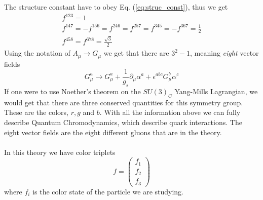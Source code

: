 \documentclass[12pt, a4paper]{book}
\begin{document}
The structure constant have to obey Eq. (\ref{eq:struc_const}), thus we get 
\begin{align*}
    f^{123}=1\\
    f^{147}=-f^{156}=f^{246}=f^{257}=f^{345}=-f^{367}={\frac{1}{2}}\\
    f^{458}=f^{678}={\frac {\sqrt {3}}{2}}
\end{align*}
Using the notation of $A_\mu\rightarrow G_\mu$ we get that there are $3^2-1$, meaning \textit{eight} vector fields 
$$
G_\mu^a \rightarrow G^a_\mu +\frac{1}{g_s}\partial_\mu\alpha^a +\epsilon^{abc}G_\mu^b\alpha^c
$$
If one were to use Noether's theorem on the $SU(3)_C$ Yang-Mills Lagrangian, we would get that there are three conserved quantities for this symmetry group. These are the colors, $r,g$ and $b$. With all the information above we can 
fully describe Quantum Chromodynamics, which describe quark interactions. The eight vector fields are the eight different gluons that are in the theory.\\
\\In this theory we have color triplets
$$
f=\begin{pmatrix}
    f_1\\f_2\\f_3
\end{pmatrix}
$$
where $f_i$ is the color state of the particle we are studying.
\end{document}
